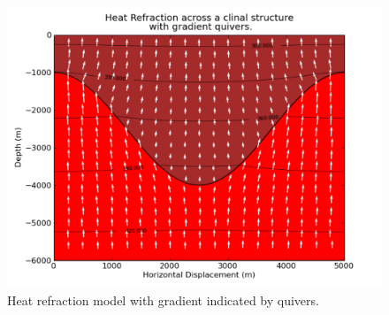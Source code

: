 \begin{figure}
\centerline{\includegraphics[width=4.in]{figures/heatrefraction001contqu}}
\caption{Heat refraction model with gradient indicated by quivers.}
\label{fig:hr001qumodel}
\end{figure}

